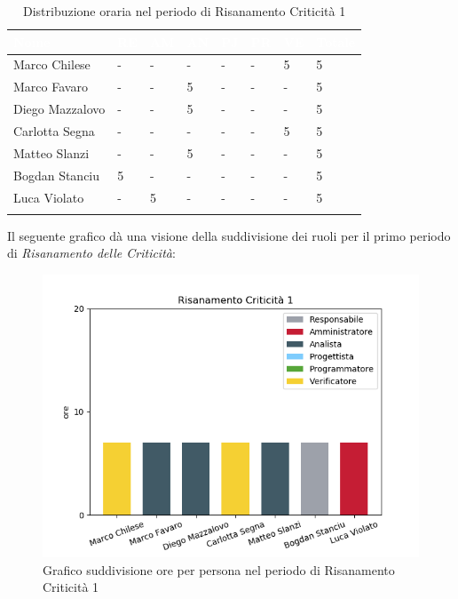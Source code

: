 \begin{longtable}{|C{.30\textwidth}|C{.06\textwidth}|C{.06\textwidth}|C{.06\textwidth} | C{.06\textwidth}| C{.06\textwidth} | C{.06\textwidth} | C{.10\textwidth} |}
\hline
{}	\textbf{\textcolor{white}{Nome}} & \textbf{\textcolor{white}{RE}} & \textbf{\textcolor{white}{AM}} & \textbf{\textcolor{white}{AN}} & \textbf{\textcolor{white}{PJ}} & \textbf{\textcolor{white}{PR}} & \textbf{\textcolor{white}{VE}} & \textbf{\textcolor{white}{Totale}}\\
\hline 
Marco Chilese & - & - & - & - & - & 5 & 5 \\
\hline
{}Marco Favaro & - & - & 5 & - & - & - & 5 \\
\hline
Diego Mazzalovo & - & - & 5 & - & - & - & 5 \\
\hline
{}Carlotta Segna & - & - & - & - & - & 5 & 5 \\
\hline
Matteo Slanzi & - & - & 5 & - & - & - & 5 \\
\hline
{}Bogdan Stanciu & 5 & - & - & - & - & - & 5 \\
\hline
Luca Violato & - & 5 & - & - & - & - & 5 \\
\hline

\caption{Distribuzione oraria nel periodo di Risanamento Criticità 1}
\label{Distribuzione oraria del periodo di rc1}
\end{longtable}



Il seguente grafico dà una visione della suddivisione dei ruoli per il primo periodo di \textit{Risanamento delle Criticità}:
\begin{figure}[H]
  \centering
  \includegraphics[width=0.8\linewidth]{./images/fig_rc1.png}
  \caption{Grafico suddivisione ore per persona nel periodo di Risanamento Criticità 1}
  \label{fig:grafico suddivione ruoli rc1}
\end{figure}

